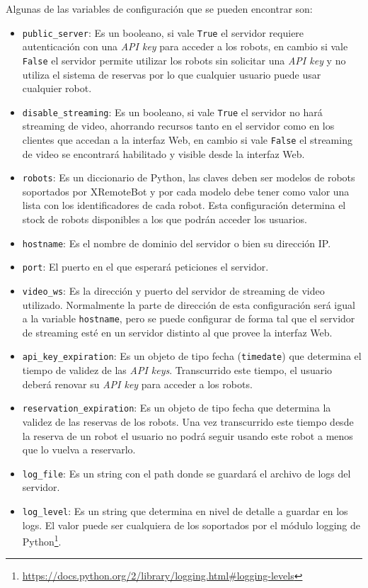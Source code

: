 Algunas de las variables de configuración que se pueden encontrar son:
\begin{itemize}
    \item \texttt{public\_server}: Es un booleano, si vale \texttt{True}
        el servidor requiere autenticación con una \textit{API key} para
        acceder a los robots, en cambio si vale \texttt{False} el servidor
        permite utilizar los robots sin solicitar una \textit{API key} y
        no utiliza el sistema de reservas por lo que cualquier usuario
        puede usar cualquier robot.
    \item \texttt{disable\_streaming}: Es un booleano, si vale \texttt{True}
        el servidor no hará streaming de video, ahorrando recursos tanto
        en el servidor como en los clientes que accedan a la interfaz Web,
        en cambio si vale
        \texttt{False} el streaming de video se encontrará habilitado
        y visible desde la interfaz Web.
    \item \texttt{robots}: Es un diccionario de Python, las claves
        deben ser modelos de robots soportados por XRemoteBot y por
        cada modelo debe tener como valor una lista con los identificadores
        de cada robot. Esta configuración determina el stock de robots
        disponibles a los que podrán acceder los usuarios.
    \item \texttt{hostname}: Es el nombre de dominio del servidor o bien
        su dirección IP.
    \item \texttt{port}: El puerto en el que esperará peticiones el
        servidor.
    \item \texttt{video\_ws}: Es la dirección y puerto del servidor de
        streaming de video utilizado. Normalmente la parte de
        dirección de esta configuración será igual a la variable
        \texttt{hostname}, pero se puede configurar de forma tal
        que el servidor de streaming esté en un servidor distinto
        al que provee la interfaz Web.
    \item \texttt{api\_key\_expiration}: Es un objeto de tipo fecha
        (\texttt{timedate}) que determina el tiempo de validez
        de las \textit{API keys}. Transcurrido este tiempo, el
        usuario deberá renovar su \textit{API key} para acceder
        a los robots.
    \item \texttt{reservation\_expiration}: Es un objeto de tipo
        fecha que determina la validez de las reservas de los robots.
        Una vez transcurrido este tiempo desde la reserva de un robot
        el usuario no podrá seguir usando este robot a menos que lo
        vuelva a reservarlo.
    \item \texttt{log\_file}: Es un string con el path donde se
        guardará el archivo de logs del servidor.
    \item \texttt{log\_level}: Es un string que determina en nivel
        de detalle a guardar en los logs. El valor puede ser
        cualquiera de los soportados por el módulo logging de
        Python\footnote{\url{https://docs.python.org/2/library/logging.html\#logging-levels}}.
\end{itemize}

